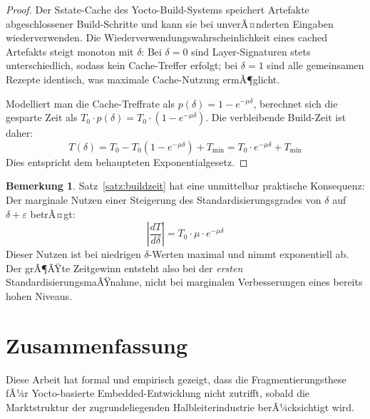 ﻿\documentclass[a4paper,12pt]{article}
\theoremstyle{definition}
\newtheorem{bemerkung}{Bemerkung}
\begin{document}
\begin{proof}
	Der Sstate-Cache des Yocto-Build-Systems speichert Artefakte abgeschlossener
	Build-Schritte und kann sie bei unverÃ¤nderten Eingaben wiederverwenden.
	Die Wiederverwendungswahrscheinlichkeit eines cached Artefakts steigt monoton
	mit $\delta$: Bei $\delta = 0$ sind Layer-Signaturen stets unterschiedlich,
	sodass kein Cache-Treffer erfolgt; bei $\delta = 1$ sind alle gemeinsamen
	Rezepte identisch, was maximale Cache-Nutzung ermÃ¶glicht.

	Modelliert man die Cache-Treffrate als $p(\delta) = 1 - e^{-\mu \delta}$,
	berechnet sich die gesparte Zeit als $T_0 \cdot p(\delta) = T_0 \cdot (1 - e^{-\mu \delta})$.
	Die verbleibende Build-Zeit ist daher:
	\[
	T(\delta) = T_0 - T_0(1 - e^{-\mu \delta}) + T_{\min} = T_0 \cdot e^{-\mu \delta} + T_{\min}
	\]
	Dies entspricht dem behaupteten Exponentialgesetz.
\end{proof}

\begin{bemerkung}
	Satz~\ref{satz:buildzeit} hat eine unmittelbar praktische Konsequenz:
	Der marginale Nutzen einer Steigerung des Standardisierungsgrades von $\delta$ auf
	$\delta + \varepsilon$ betrÃ¤gt:
	\[
	\left|\frac{dT}{d\delta}\right| = T_0 \cdot \mu \cdot e^{-\mu \delta}
	\]
	Dieser Nutzen ist bei niedrigen $\delta$-Werten maximal und nimmt exponentiell ab.
	Der grÃ¶ÃŸte Zeitgewinn entsteht also bei der \emph{ersten} StandardisierungsmaÃŸnahme,
	nicht bei marginalen Verbesserungen eines bereits hohen Niveaus.
\end{bemerkung}

\section{Zusammenfassung}

Diese Arbeit hat formal und empirisch gezeigt, dass die Fragmentierungsthese fÃ¼r
Yocto-basierte Embedded-Entwicklung nicht zutrifft, sobald die Marktstruktur der
zugrundeliegenden Halbleiterindustrie berÃ¼cksichtigt wird.
\end{document}
